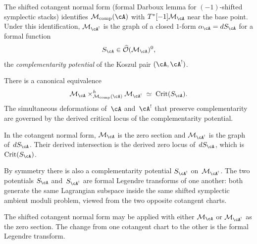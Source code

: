 \begin{definition}
\label{def:complementarity-potential}
The shifted cotangent normal form
(formal Darboux lemma for $(-1)$-shifted symplectic stacks)
identifies $\mathcal{M}_{\mathrm{comp}}(\cA)$ with
$T^*[-1]\mathcal{M}_\cA$ near the base point.  Under this
identification, $\mathcal{M}_{\cA^!}$ is the graph of a
closed $1$-form $\alpha_\cA = dS_\cA$ for a formal function
\[
S_\cA \in \widehat{\mathcal{O}}(\mathcal{M}_\cA)^0,
\]
the \emph{complementarity potential} of the Koszul pair
$(\cA, \cA^!)$.
\end{definition}

\begin{conjecture}
\label{thm:derived-critical-locus}
There is a canonical equivalence
\[
\mathcal{M}_\cA \times^h_{\mathcal{M}_{\mathrm{comp}}(\cA)}
\mathcal{M}_{\cA^!}
\;\simeq\;
\mathrm{Crit}(S_\cA).
\]
The simultaneous deformations of~$\cA$ and~$\cA^!$ that
preserve complementarity are governed by the derived
critical locus of the complementarity potential.
\end{conjecture}

\begin{evidence}[Evidence]
In the cotangent normal form, $\mathcal{M}_\cA$ is the zero
section and $\mathcal{M}_{\cA^!}$ is the graph of~$dS_\cA$.
Their derived intersection is the derived zero locus
of~$dS_\cA$, which is $\mathrm{Crit}(S_\cA)$.
\end{evidence}

\begin{conjecture}
\label{prop:formal-legendre}
By symmetry there is also a complementarity potential
$S_{\cA^!}$ on~$\mathcal{M}_{\cA^!}$.  The two potentials
$S_\cA$ and~$S_{\cA^!}$ are formal Legendre transforms of
one another: both generate the same Lagrangian subspace
inside the same shifted symplectic ambient moduli problem,
viewed from the two opposite cotangent charts.
\end{conjecture}

\begin{evidence}[Evidence]
The shifted cotangent normal form may be applied with either
$\mathcal{M}_\cA$ or $\mathcal{M}_{\cA^!}$ as the zero
section.  The change from one cotangent chart to the other
is the formal Legendre transform.
\end{evidence}

